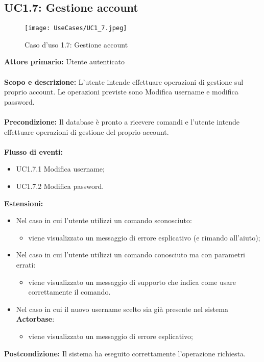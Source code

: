 \documentclass{scalatekids-article}
\begin{document}
\subsection{UC1.7: Gestione account}
\begin{figure}[H]
  \begin{center}
    \texttt{[image: UseCases/UC1\_7.jpeg]}
    \caption{Caso d'uso 1.7: Gestione account}
  \end{center}
\end{figure}
\textbf{Attore primario:} Utente autenticato\\ \\
\textbf{Scopo e descrizione:} L'utente intende effettuare operazioni di gestione sul proprio account. Le operazioni previste sono
Modifica username e modifica password.\\ \\
\textbf{Precondizione:} Il database è pronto a ricevere comandi e l'utente intende effettuare operazioni di gestione del proprio account.\\ \\
\textbf{Flusso di eventi:}
\begin{itemize}
\item UC1.7.1 Modifica username;
\item UC1.7.2 Modifica password.
\end{itemize}
\textbf{Estensioni:}
\begin{itemize}
\item Nel caso in cui l'utente utilizzi un comando sconosciuto:
  \begin{itemize}
  \item viene visualizzato un messaggio di errore esplicativo (e rimando all'aiuto);
  \end{itemize}
\item Nel caso in cui l'utente utilizzi un comando conosciuto ma con parametri errati:
  \begin{itemize}
  \item viene visualizzato un messaggio di supporto che indica come usare correttamente il comando.
  \end{itemize}
\item Nel caso in cui il nuovo username scelto sia già presente nel sistema \textbf{Actorbase}:
  \begin{itemize}
  \item viene visualizzato un messaggio di errore esplicativo;
  \end{itemize}
\end{itemize}
\textbf{Postcondizione:} Il sistema ha eseguito correttamente l'operazione richiesta.
\end{document}

